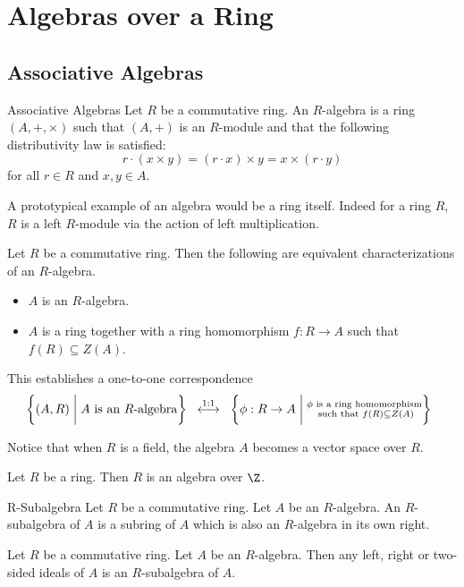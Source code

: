 \documentclass[a4paper]{article}
\begin{document}
\pagebreak
\section{Algebras over a Ring}
\subsection{Associative Algebras}
\begin{defn}{Associative Algebras}{} Let $R$ be a commutative ring. An $R$-algebra is a ring $(A,+,\times)$ such that $(A,+)$ is an $R$-module and that the following distributivity law is satisfied: $$r\cdot(x\times y)=(r\cdot x)\times y=x\times(r\cdot y)$$ for all $r\in R$ and $x,y\in A$. 
\end{defn}

A prototypical example of an algebra would be a ring itself. Indeed for a ring $R$, $R$ is a left $R$-module via the action of left multiplication. 

\begin{prp}{}{} Let $R$ be a commutative ring. Then the following are equivalent characterizations of an $R$-algebra. 
\begin{itemize}
\item $A$ is an $R$-algebra. 
\item $A$ is a ring together with a ring homomorphism $f:R\to A$ such that $f(R)\subseteq Z(A)$. 
\end{itemize}
\end{prp}

This establishes a one-to-one correspondence $$\left\{(A,R)\;\bigg{|}\;A\text{ is an }R\text{-algebra}\right\}\;\;\overset{1:1}{\longleftrightarrow}\;\;\left\{\phi:R\to A\;\bigg{|}\;\substack{\phi\text{ is a ring homomorphism}\\\text{ such that }f(R)\subseteq Z(A)}\right\}\;\;$$

Notice that when $R$ is a field, the algebra $A$ becomes a vector space over $R$. 

\begin{lmm}{}{} Let $R$ be a ring. Then $R$ is an algebra over $\Z$. 
\end{lmm}

\begin{defn}{R-Subalgebra}{} Let $R$ be a commutative ring. Let $A$ be an $R$-algebra. An $R$-subalgebra of $A$ is a subring of $A$ which is also an $R$-algebra in its own right. 
\end{defn}

\begin{prp}{}{} Let $R$ be a commutative ring. Let $A$ be an $R$-algebra. Then any left, right or two-sided ideals of $A$ is an $R$-subalgebra of $A$. 
\end{prp}
\end{document}
